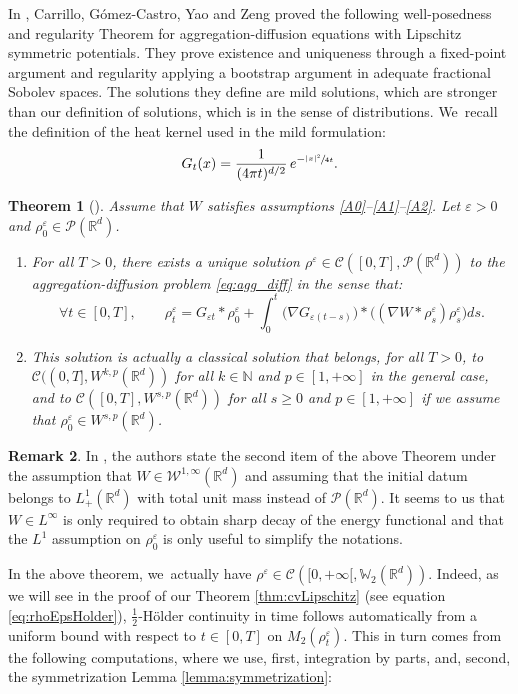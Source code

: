 \documentclass[11pt]{article}
\numberwithin{equation}{section}
\def\NN{\mathbb{N}}
\def\RR{\mathbb{R}}
\def\WW{\mathbb{W}}
\def\eps{\varepsilon}
\def\calC{{\mathcal C}}
\def\calP{{\mathcal P}}
\def\calW{{\mathcal W}}
\theoremstyle{plain}
\newtheorem{theorem}{Theorem}[section]
\theoremstyle{definition}
\newtheorem{remark}[theorem]{Remark}
\begin{document}
In \cite{carrilloAsymptotic21}, Carrillo, Gómez-Castro, Yao and Zeng proved the following well-posedness and regularity Theorem for aggregation-diffusion equations with Lipschitz symmetric potentials. They prove existence and uniqueness through a ﬁxed-point argument and regularity applying a bootstrap argument in adequate fractional Sobolev spaces. The solutions they define are mild solutions, which are stronger than our definition of solutions, which is in the sense of distributions. We~recall the definition of the heat kernel used in the mild formulation:
\[
G_t(x) = \frac{1}{(4\pi t)^{d/2}}\, e^{-\sfrac{|x|^2}{4t}}.
\]
\begin{theorem}[{\cite[Th.\,1.1, 2.1 \& 2.2]{carrilloAsymptotic21}}]\label{thm:agg_diff:WP}
Assume that $W$ satisfies assumptions \eqref{A0}--\eqref{A1}--\eqref{A2}. Let $\eps > 0$ and $\rho_0^\eps \in \calP(\RR^d)$.
\begin{enumerate}
\item For all $T>0$, there exists a unique solution $\rho^\eps \in \calC([0,T], \calP(\RR^d))$ to the aggregation-diffusion problem \eqref{eq:agg_diff} in the sense that:
\[
\forall t \in [0,T], \qquad \rho_t^\eps = G_{\eps t} * \rho_0^\eps + \int_0^t \big(\nabla G_{\eps(t-s)}\big) * \big((\nabla W * \rho_s^\eps) \rho_s^\eps\big) ds.
\]
\item This solution is actually a classical solution that belongs, for all $T>0$, to $\calC((0,T], W^{k,p}(\RR^d))$ for all $k \in \NN$ and $p \in [1,+\infty]$ in the general case, and to $\calC([0,T], W^{s,p}(\RR^d))$ for all $s \geq 0$ and $p \in [1,+\infty]$ if we assume that $\rho_0^\eps \in W^{s,p}(\RR^d)$.
\end{enumerate}
\end{theorem}
\begin{remark}
In \cite{carrilloAsymptotic21}, the authors state the second item of the above Theorem under the assumption that $W \in \calW^{1,\infty}(\RR^d)$ and assuming that the initial datum belongs to $L^1_+(\RR^d)$ with total unit mass instead of $\calP(\RR^d)$. It seems to us that $W \in L^\infty$ is only required to obtain sharp decay of the energy functional and that the $L^1$ assumption on $\rho_0^\eps$ is only useful to simplify the notations.
\end{remark}
In the above theorem, we~actually have $\rho^\eps \in \calC([0,+\infty[, \WW_2(\RR^d))$. Indeed, as we will see in the proof of our Theorem \ref{thm:cvLipschitz} (see equation \eqref{eq:rhoEpsHolder}), $\frac 12$-Hölder continuity in time follows automatically from a uniform bound with respect to $t \in [0,T]$ on $M_2(\rho_t^\eps)$. This in turn comes from the following computations, where we use, first, integration by parts, and, second, the symmetrization Lemma \ref{lemma:symmetrization}:
\end{document}
